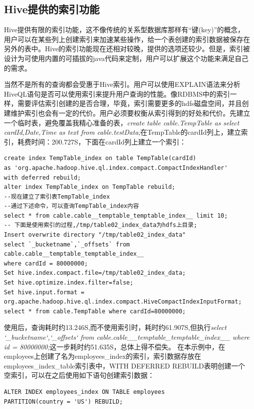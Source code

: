 \subsection{Hive提供的索引功能}
\par Hive提供有限的索引功能，这不像传统的关系型数据库那样有“键(key)”的概念，用户可以在某些列上创建索引来加速某些操作，给一个表创建的索引数据被保存在另外的表中。Hive的索引功能现在还相对较晚，提供的选项还较少。但是，索引被设计为可使用内置的可插拔的java代码来定制，用户可以扩展这个功能来满足自己的需求。
\par 当然不是所有的查询都会受惠于Hive索引。用户可以使用EXPLAIN语法来分析HiveQL语句是否可以使用索引来提升用户查询的性能。像RDBMS中的索引一样，需要评估索引创建的是否合理，毕竟，索引需要更多的hdfs磁盘空间，并且创建维护索引也会有一定的代价。用户必须要权衡从索引得到的好处和代价。先建立一个临时表，避免覆盖我精心准备的表，\textsl{create table cable.TempTable as select cardId,Date,Time as text from cable.testData;}在TempTable的cardId列上，建立索引，耗费时间：200.727S，下面在cardId列上建立一个索引：
\begin{verbatim}
create index TempTable_index on table TempTable(cardId)
as 'org.apache.hadoop.hive.ql.index.compact.CompactIndexHandler'
with deferred rebuild;
alter index TempTable_index on TempTable rebuild;
--现在建立了索引表TempTable_index
--通过下述命令，可以查询TempTable_index内容
select * from cable.cable__temptable_temptable_index__ limit 10;
-- 下面是使用索引的过程,/tmp/table02_index_data为hdfs上目录;
Insert overwrite directory "/tmp/table02_index_data" 
select `_bucketname`,`_offsets` from cable.cable__temptable_temptable_index__ 
where cardId = 80000000;
Set hive.index.compact.file=/tmp/table02_index_data;
Set hive.optimize.index.filter=false;
Set hive.input.format = 
org.apache.hadoop.hive.ql.index.compact.HiveCompactIndexInputFormat;
select * from cable.TempTable where cardId=80000000;
\end{verbatim}
\par 使用后，查询耗时约13.246S,而不使用索引时，耗时约61.907S,但执行\textsl{select `\_bucketname`,`\_offsets` from cable.cable\_\_temptable\_temptable\_index\_\_ where id = 80000000;}这一步耗时约51.635S，总体上得不偿失。
在本示例中，在employees上创建了名为employees\_index的索引，索引数据存放在employees\_index\_table索引表中，WITH DEFERRED REBUILD表明创建一个空索引，可以在之后使用如下语句创建索引数据：
\begin{verbatim}
ALTER INDEX employees_index ON TABLE employees 
PARTITION(country = 'US') REBUILD;
\end{verbatim}
